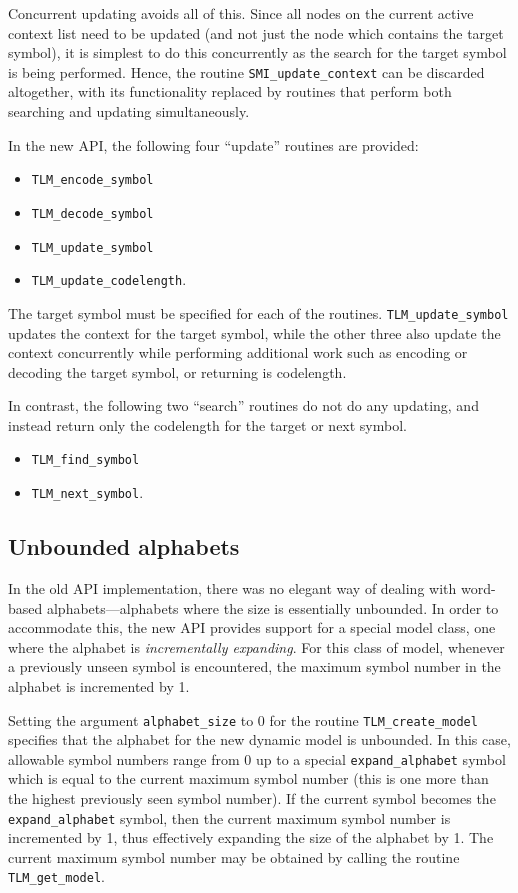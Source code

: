 \documentclass[11pt]{article}
\begin{document}
Concurrent updating avoids all of this. Since all nodes on the current active context list need to be updated
(and not just the node which contains the target symbol), it is simplest to do this concurrently as the search
for the target symbol is being performed. Hence, the routine \verb|SMI_update_context| can be discarded
altogether, with
its functionality replaced by routines that perform both searching and updating simultaneously.

In the new API, the following four ``update'' routines are provided:

\begin{itemize}
\item \verb|TLM_encode_symbol|
\item \verb|TLM_decode_symbol|
\item \verb|TLM_update_symbol|
\item \verb|TLM_update_codelength|.
\end{itemize}

The target symbol must be specified for each of the routines. \verb|TLM_update_symbol| updates the context
for the target symbol, while the other three also update the context concurrently while performing
additional work such as encoding or decoding the target symbol, or returning is codelength.

In contrast, the following two ``search'' routines do not do any updating, and instead return
only the codelength for the target or next symbol.

\begin{itemize}
\item \verb|TLM_find_symbol|
\item \verb|TLM_next_symbol|.
\end{itemize}

\subsection{Unbounded alphabets}

In the old API implementation, there was no elegant way of dealing with
word-based alphabets---alphabets where the size is essentially unbounded.
In order to accommodate this, the new API provides support for a special model class, one where the alphabet
is {\em incrementally expanding}. For this class of model, whenever a previously unseen symbol is
encountered, the maximum symbol number in the alphabet is incremented by 1.

Setting the argument \verb|alphabet_size| to 0 for the routine \verb|TLM_create_model|
specifies that the alphabet for the new dynamic model is unbounded.
In this case, allowable symbol numbers range from 0 up to a special \verb|expand_alphabet|
symbol which is equal to the current maximum symbol number (this is one more
than the highest previously seen symbol number). If the current symbol
becomes the \verb|expand_alphabet| symbol, then the current maximum symbol
number is incremented by 1, thus effectively expanding
the size of the alphabet by 1. The current maximum symbol number may be
obtained by calling the routine \verb|TLM_get_model|.
\end{document}
